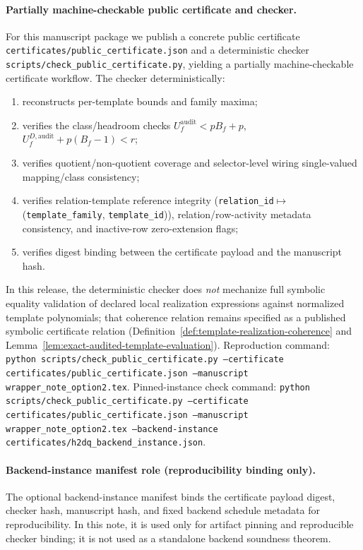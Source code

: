 ﻿\documentclass[11pt]{article}
\begin{document}
\paragraph{Partially machine-checkable public certificate and checker.}
For this manuscript package we publish a concrete public
certificate
\texttt{certificates/public\_certificate.json}
and a deterministic checker
\texttt{scripts/check\_public\_certificate.py}, yielding a partially
machine-checkable certificate workflow.
The checker deterministically:
\begin{enumerate}[label=(\roman*),leftmargin=2em]
    \item reconstructs per-template bounds and family maxima;
    \item verifies the class/headroom checks
    \(U_f^{\mathrm{audit}}<pB_f+p\),
    \(U_f^{D,\mathrm{audit}}+p(B_f-1)<r\);
    \item verifies quotient/non-quotient coverage and selector-level wiring
    single-valued mapping/class consistency;
    \item verifies relation-template reference integrity
    (\texttt{relation\_id}\(\mapsto\)(\texttt{template\_family},
    \texttt{template\_id})), relation/row-activity metadata consistency, and
    inactive-row zero-extension flags;
    \item verifies digest binding between the certificate payload and the
    manuscript hash.
\end{enumerate}
In this release, the deterministic checker does \emph{not} mechanize full
symbolic equality validation of declared local realization expressions against
normalized template polynomials; that coherence relation remains specified as a
published symbolic certificate relation (Definition~\ref{def:template-realization-coherence}
and Lemma~\ref{lem:exact-audited-template-evaluation}).
Reproduction command:
\texttt{python scripts/check\_public\_certificate.py --certificate certificates/public\_certificate.json --manuscript wrapper\_note\_option2.tex}.
Pinned-instance check command:
\texttt{python scripts/check\_public\_certificate.py --certificate certificates/public\_certificate.json --manuscript wrapper\_note\_option2.tex --backend-instance certificates/h2dq\_backend\_instance.json}.
\paragraph{Backend-instance manifest role (reproducibility binding only).}
The optional backend-instance manifest binds the certificate payload digest,
checker hash, manuscript hash, and fixed backend schedule metadata for
reproducibility. In this note, it is used only for artifact pinning and
reproducible checker binding; it is not used as a standalone backend soundness
theorem.
\end{document}
